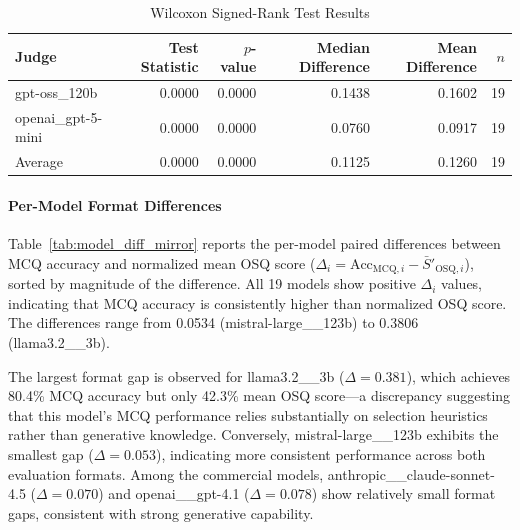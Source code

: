 \begin{table}[htbp]
\centering
\caption{Wilcoxon Signed-Rank Test Results}
\label{tab:wilcoxon_mirror}
\begin{tabular}{lrrrrr}
\toprule
Judge & Test Statistic & $p$-value & Median Difference & Mean Difference & $n$ \\
\midrule
gpt-oss\_120b        & 0.0000 & 0.0000 & 0.1438 & 0.1602 & 19 \\
openai\_gpt-5-mini  & 0.0000 & 0.0000 & 0.0760 & 0.0917 & 19 \\
Average             & 0.0000 & 0.0000 & 0.1125 & 0.1260 & 19 \\
\bottomrule
\end{tabular}
\end{table}






\paragraph{Per-Model Format Differences}

Table~\ref{tab:model_diff_mirror} reports the per-model paired differences between MCQ accuracy and normalized mean OSQ score ($\Delta_i = \text{Acc}_{\text{MCQ},i} - \bar{S}'_{\text{OSQ},i}$), sorted by magnitude of the difference. All 19 models show positive $\Delta_i$ values, indicating that MCQ accuracy is consistently higher than normalized OSQ score. The differences range from 0.0534 (mistral-large\_\_123b) to 0.3806 (llama3.2\_\_3b).

The largest format gap is observed for llama3.2\_\_3b ($\Delta = 0.381$), which achieves 80.4\% MCQ accuracy but only 42.3\% mean OSQ score---a discrepancy suggesting that this model's MCQ performance relies substantially on selection heuristics rather than generative knowledge. Conversely, mistral-large\_\_123b exhibits the smallest gap ($\Delta = 0.053$), indicating more consistent performance across both evaluation formats. Among the commercial models, anthropic\_\_claude-sonnet-4.5 ($\Delta = 0.070$) and openai\_\_gpt-4.1 ($\Delta = 0.078$) show relatively small format gaps, consistent with strong generative capability.

